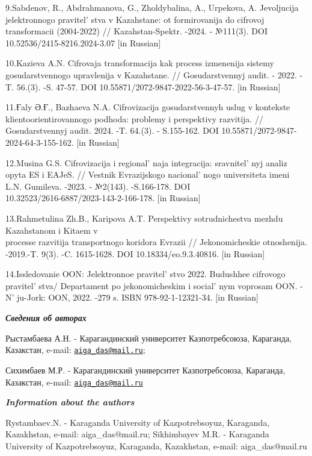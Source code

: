 \begin{references}
9.Sabdenov, R., Abdrahmanova, G., Zholdybalina, A., Urpekova, A.
Jevoljucija jelektronnogo pravitel' stva v Kazahstane: ot
formirovanija do cifrovoj transformacii (2004-2022) // Kazahstan-Spektr.
-2024. - №111(3). DOI 10.52536/2415-8216.2024-3.07 {[}in Russian{]}

10.Kazieva A.N. Cifrovaja transformacija kak process izmenenija sistemy
gosudarstvennogo upravlenija v Kazahstane. // Gosudarstvennyj audit. -
2022. -T. 56.(3). -S. 47-57. DOI 10.55871/2072-9847-2022-56-3-47-57.
{[}in Russian{]}

11.Ғaly Ә.Ғ., Bazhaeva N.A. Cifrovizacija gosudarstvennyh uslug v
kontekste klientoorientirovannogo podhoda: problemy i perspektivy
razvitija. // Gosudarstvennyj audit. 2024. -T. 64.(3). - S.155-162. DOI
10.55871/2072-9847-2024-64-3-155-162. {[}in Russian{]}

12.Musina G.S. Cifrovizacija i regional' naja
integracija: sravnitel' nyj analiz opyta ES i EAJeS. //
Vestnik Evrazijskogo nacional' nogo universiteta imeni
L.N. Gumileva. -2023. - №2(143). -S.166-178. DOI\\
10.32523/2616-6887/2023-143-2-166-178. {[}in Russian{]}

13.Rahmetulina Zh.B., Karipova A.T. Perspektivy sotrudnichestva mezhdu
Kazahstanom i Kitaem v \\processe razvitija transportnogo koridora Evrazii
// Jekonomicheskie otnoshenija. -2019.-T. 9(3). -C. 1615-1628. DOI
10.18334/eo.9.3.40816. {[}in Russian{]}

14.Issledovanie OON: Jelektronnoe pravitel' stvo 2022.
Budushhee cifrovogo pravitel' stva/ Departament po
jekonomicheskim i social' nym voprosam OON. -
N' ju-Jork: OON, 2022. -279 s. ISBN 978-92-1-12321-34.
{[}in Russian{]}
\end{references}

\begin{authorinfo}
\emph{{\bfseries Сведения об авторах}}

Рыстамбаева А.Н. - Карагандинский университет Казпотребсоюза, Караганда,
Казакстан, e-mail:
\href{mailto:aiga_das@mail.ru}{\nolinkurl{aiga\_das@mail.ru}};

Сихимбаев М.Р. - Карагандинский университет Казпотребсоюза, Караганда,
Казакстан, e-mail:
\href{mailto:aiga_das@mail.ru}{\nolinkurl{aiga\_das@mail.ru}}

\emph{{\bfseries Information about the authors}}

Rystambaev.N. - Karaganda University of Kazpotrebsoyuz, Karaganda,
Kazakhstan, e-mail: aiga\_das@mail.ru; Sikhimbayev M.R. - Karaganda
University of Kazpotrebsoyuz, Karaganda, Kazakhstan, e-mail:
aiga\_das@mail.ru
\end{authorinfo}

